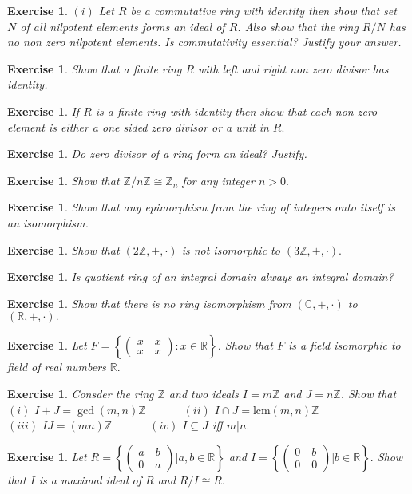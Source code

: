 \documentclass[11pt]{amsart}
\newtheorem{ex}[theorem]{Exercise}
\newcommand{\ZZ}{\mathbb Z}
\newcommand{\CC}{\mathbb C}
\newcommand{\RR}{\mathbb R}
\newcommand{\lcm}[1]{\text{lcm}(#1)}
\begin{document}
\begin{ex}
$(i)$ Let $R$ be a commutative ring with identity then show that set $N$ of all nilpotent elements forms an ideal of $R$. Also show that the ring $R/N$ has no non zero nilpotent elements. Is commutativity essential? Justify your answer.
\end{ex}
\begin{ex}
Show that a finite ring $R$ with left and right non zero divisor has identity.
\end{ex}
\begin{ex}
If $R$ is a finite ring with identity then show that each non zero element is either a one sided zero divisor or a unit in $R.$
\end{ex}
\begin{ex}
Do zero divisor of a ring form an ideal? Justify.
\end{ex}
\begin{ex}
Show that ${\ZZ}/n{\ZZ}\cong {\ZZ}_n$ for any integer $n>0.$
\end{ex}
\begin{ex}
Show that any epimorphism from the ring of integers onto itself is an isomorphism.
\end{ex}
\begin{ex}
Show that $(2{\ZZ},+,\cdot)$ is not isomorphic to $(3{\ZZ},+,\cdot).$
\end{ex}
\begin{ex}
Is quotient ring of an integral domain always an integral domain?
\end{ex}
\begin{ex}
Show that there is no ring isomorphism from $({\CC},+,\cdot)$ to $({\RR},+,\cdot).$
\end{ex}
\begin{ex}
Let $F=\left\lbrace \begin{pmatrix}
x\quad x\\
x\quad x
\end{pmatrix}:x\in {\RR}\right\rbrace$. Show that $F$ is a field isomorphic to field of real numbers ${\RR}.$
\end{ex}
\begin{ex}
Consder the ring ${\ZZ}$ and two ideals $I=m{\ZZ}$ and $J=n{\ZZ}$. Show that \\
$(i)$ $I+J=\gcd(m,n){\ZZ}\quad\quad\quad$			$(ii)$ $I\cap J=\lcm{m,n}{\ZZ}$\\
$(iii)$ $IJ=(mn){\ZZ}\quad\quad\quad$				$(iv)$ $I\subseteq J$ iff $m|n.$
\end{ex}
\begin{ex}
Let $R=\left\lbrace \begin{pmatrix}
a \quad b\\
0\quad a
\end{pmatrix}\bigg|a,b\in {\RR}\right\rbrace$ and $I=\left\lbrace \begin{pmatrix}
0 \quad b\\
0\quad 0
\end{pmatrix}\bigg|b\in {\RR}\right\rbrace.$ Show that $I$ is a maximal ideal of $R$ and $R/I\cong R.$
\end{ex}
\end{document}
